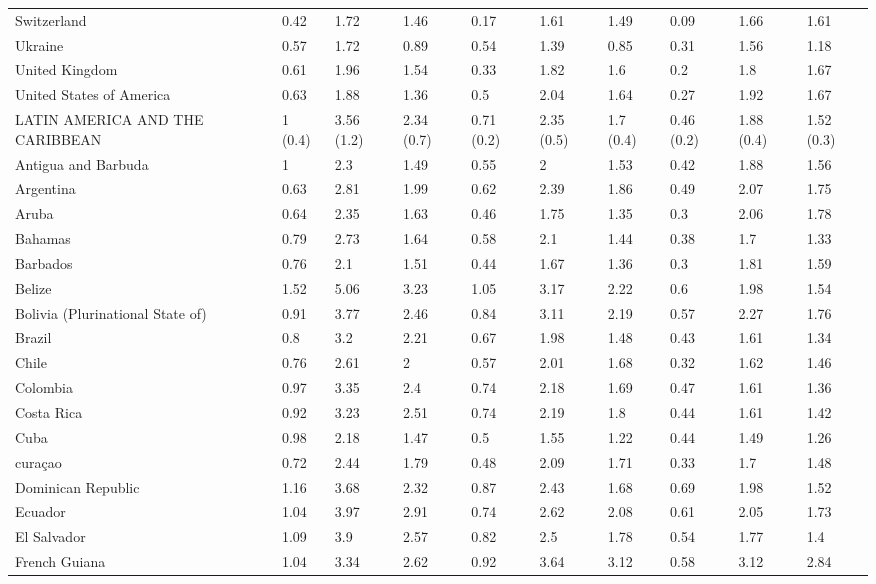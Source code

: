 \begin{longtable}[t]{llllllllll}
Switzerland & 0.42 & 1.72 & 1.46 & 0.17 & 1.61 & 1.49 & 0.09 & 1.66 & 1.61\\
Ukraine & 0.57 & 1.72 & 0.89 & 0.54 & 1.39 & 0.85 & 0.31 & 1.56 & 1.18\\
United Kingdom & 0.61 & 1.96 & 1.54 & 0.33 & 1.82 & 1.6 & 0.2 & 1.8 & 1.67\\
United States of America & 0.63 & 1.88 & 1.36 & 0.5 & 2.04 & 1.64 & 0.27 & 1.92 & 1.67\\
LATIN AMERICA AND THE CARIBBEAN & 1 (0.4) & 3.56 (1.2) & 2.34 (0.7) & 0.71 (0.2) & 2.35 (0.5) & 1.7 (0.4) & 0.46 (0.2) & 1.88 (0.4) & 1.52 (0.3)\\
Antigua and Barbuda & 1 & 2.3 & 1.49 & 0.55 & 2 & 1.53 & 0.42 & 1.88 & 1.56\\
Argentina & 0.63 & 2.81 & 1.99 & 0.62 & 2.39 & 1.86 & 0.49 & 2.07 & 1.75\\
Aruba & 0.64 & 2.35 & 1.63 & 0.46 & 1.75 & 1.35 & 0.3 & 2.06 & 1.78\\
Bahamas & 0.79 & 2.73 & 1.64 & 0.58 & 2.1 & 1.44 & 0.38 & 1.7 & 1.33\\
Barbados & 0.76 & 2.1 & 1.51 & 0.44 & 1.67 & 1.36 & 0.3 & 1.81 & 1.59\\
Belize & 1.52 & 5.06 & 3.23 & 1.05 & 3.17 & 2.22 & 0.6 & 1.98 & 1.54\\
Bolivia (Plurinational State of) & 0.91 & 3.77 & 2.46 & 0.84 & 3.11 & 2.19 & 0.57 & 2.27 & 1.76\\
Brazil & 0.8 & 3.2 & 2.21 & 0.67 & 1.98 & 1.48 & 0.43 & 1.61 & 1.34\\
Chile & 0.76 & 2.61 & 2 & 0.57 & 2.01 & 1.68 & 0.32 & 1.62 & 1.46\\
Colombia & 0.97 & 3.35 & 2.4 & 0.74 & 2.18 & 1.69 & 0.47 & 1.61 & 1.36\\
Costa Rica & 0.92 & 3.23 & 2.51 & 0.74 & 2.19 & 1.8 & 0.44 & 1.61 & 1.42\\
Cuba & 0.98 & 2.18 & 1.47 & 0.5 & 1.55 & 1.22 & 0.44 & 1.49 & 1.26\\
curaçao & 0.72 & 2.44 & 1.79 & 0.48 & 2.09 & 1.71 & 0.33 & 1.7 & 1.48\\
Dominican Republic & 1.16 & 3.68 & 2.32 & 0.87 & 2.43 & 1.68 & 0.69 & 1.98 & 1.52\\
Ecuador & 1.04 & 3.97 & 2.91 & 0.74 & 2.62 & 2.08 & 0.61 & 2.05 & 1.73\\
El Salvador & 1.09 & 3.9 & 2.57 & 0.82 & 2.5 & 1.78 & 0.54 & 1.77 & 1.4\\
French Guiana & 1.04 & 3.34 & 2.62 & 0.92 & 3.64 & 3.12 & 0.58 & 3.12 & 2.84\\

\end{longtable}
